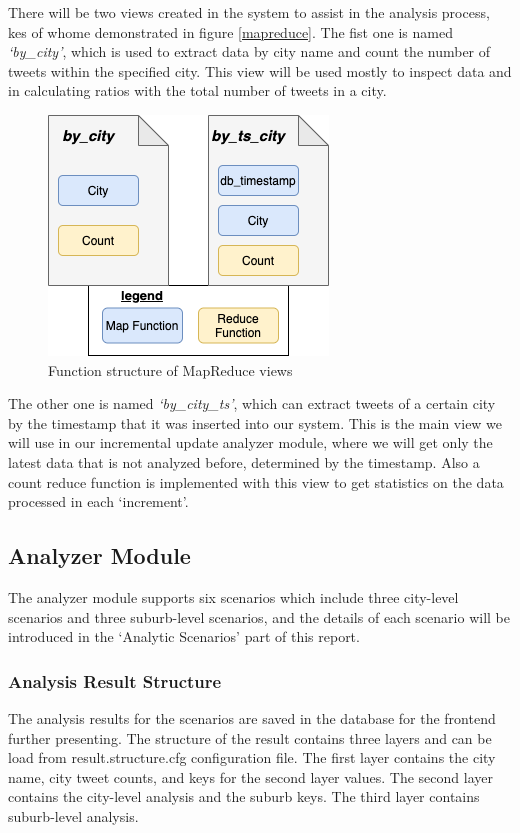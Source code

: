 \documentclass{article}
\begin{document}
There will be two views created in the system to assist in the analysis process, kes of whome demonstrated in figure \ref{mapreduce}. The fist one is named \textit{‘by\_city’}, which is used to extract data by city name and count the number of tweets within the specified city. This view will be used mostly to inspect data and in calculating ratios with the total number of tweets in a city.
\begin{figure}[hbp]
\centering
\includegraphics{img/mapreduce.png}
\caption{Function structure of MapReduce views}
\label{fig:mapreduce}
\end{figure}

The other one is named \textit{‘by\_city\_ts’}, which can extract tweets of a certain city by the timestamp that it was inserted into our system. This is the main view we will use in our incremental update analyzer module, where we will get only the latest data that is not analyzed before, determined by the timestamp. Also a count reduce function is implemented with this view to get statistics on the data processed in each ‘increment’.

\subsection{Analyzer Module}
The analyzer module supports six scenarios which include three city-level scenarios and three suburb-level scenarios, and the details of each scenario will be introduced in the ‘Analytic Scenarios’ part of this report.
\subsubsection{Analysis Result Structure}
The analysis results for the scenarios are saved in the database for the frontend further presenting. The structure of the result contains three layers and can be load from result.structure.cfg configuration file. The first layer contains the city name, city tweet counts, and keys for the second layer values. The second layer contains the city-level analysis and the suburb keys. The third layer contains suburb-level analysis.
\end{document}
